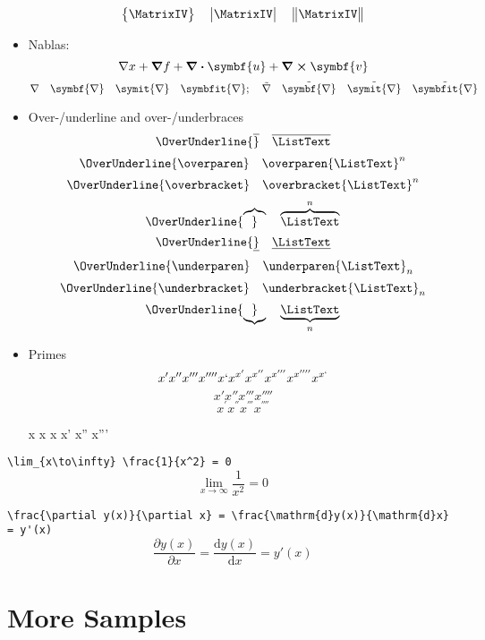 \documentclass { article }
\begin{document}
\begin{itemize}
\[          \begin{Bmatrix} \MatrixIV  \end{Bmatrix} \quad
          \begin{vmatrix} \MatrixIV  \end{vmatrix} \quad
          \begin{Vmatrix} \MatrixIV  \end{Vmatrix}
        \]
  \item Nablas:
        \[ \nabla x + \grad{f} + \divergence{\symbf{u}} + \curl{\symbf{v}} \]
        \[
          \nabla                 \quad \symbf{\nabla}           \quad
          \symit{\nabla}         \quad \symbfit{\nabla};        \quad
          \tilde{\nabla}         \quad \tilde{\symbf{\nabla}}   \quad
          \tilde{\symit{\nabla}} \quad \tilde{\symbfit{\nabla}}
        \]
  \item Over-/underline and over-/underbraces
        \[ \OverUnderline{\overline}     \quad \overline     {\ListText}   \]
        \[ \OverUnderline{\overparen}    \quad \overparen    {\ListText}^n \]
        \[ \OverUnderline{\overbracket}  \quad \overbracket  {\ListText}^n \]
        \[ \OverUnderline{\overbrace}    \quad \overbrace    {\ListText}^n \]
        \[ \OverUnderline{\underline}    \quad \underline    {\ListText}   \]
        \[ \OverUnderline{\underparen}   \quad \underparen   {\ListText}_n \]
        \[ \OverUnderline{\underbracket} \quad \underbracket {\ListText}_n \]
        \[ \OverUnderline{\underbrace}   \quad \underbrace   {\ListText}_n \]
  \item Primes
        \[ x' x'' x''' x'''' x` x^{x'} x^{x''} x^{x'''} x^{x''''} x^{x`} \]
        \[ x \prime x \dprime x \trprime x \qprime \]
        \[ x^{\prime} x^{\dprime} x^{\trprime} x^{\qprime} \] %
        \begin{center}
          \firatext x x x x' x'' x'''
        \end{center}
\end{itemize}

\verb|\lim_{x\to\infty} \frac{1}{x^2} = 0|
\[ \lim_{x\to\infty} \frac{1}{x^2} = 0 \]

\verb|\frac{\partial y(x)}{\partial x} = \frac{\mathrm{d}y(x)}{\mathrm{d}x} = y'(x)|
\[ \frac{\partial y(x)}{\partial x} = \frac{\mathrm{d}y(x)}{\mathrm{d}x} = y'(x) \]

\section{More Samples}
\end{document}

